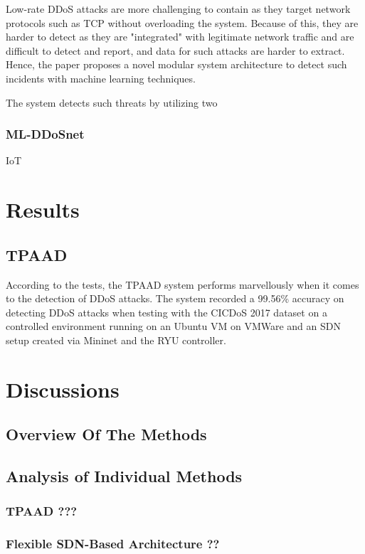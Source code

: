 \documentclass[a4paper, 12pt]{article}
\begin{document}
Low-rate DDoS attacks are more challenging to contain as they target network protocols such as TCP without overloading the system. Because of this, they are harder to detect as they are "integrated" with legitimate network traffic and are difficult to detect and report, and data for such attacks are harder to extract. Hence, the paper proposes a novel modular system architecture to detect such incidents with machine learning techniques. 

The system detects such threats by utilizing two

\subsubsection{ML-DDoSnet}

IoT \cite{5}

\section{Results}

\subsection{TPAAD}
According to the tests, the TPAAD system performs marvellously when it comes to the detection of DDoS attacks. The system recorded a 99.56\% accuracy on detecting DDoS attacks when testing with the CICDoS 2017 dataset on a controlled environment running on an Ubuntu VM on VMWare and an SDN setup created via Mininet and the RYU controller. 

\section{Discussions}
\subsection{Overview Of The Methods}
\subsection{Analysis of Individual Methods}
\subsubsection{TPAAD ???}
\subsubsection{Flexible SDN-Based Architecture ??}
\end{document}
